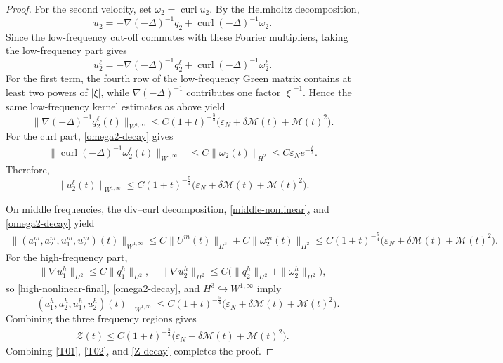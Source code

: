 \documentclass[10pt,a4paper]{amsart}
\begin{document}
\begin{proof}
For the second velocity, set $\omega_2=\operatorname{curl}u_2$. By the Helmholtz decomposition,
\[
u_2=-\nabla(-\Delta)^{-1}q_2
+\operatorname{curl}(-\Delta)^{-1}\omega_2.
\]
Since the low-frequency cut-off commutes with these Fourier multipliers,
taking the low-frequency part gives
\[
u_2^\ell=-\nabla(-\Delta)^{-1}q_2^\ell
+\operatorname{curl}(-\Delta)^{-1}\omega_2^\ell.
\]
For the first term, the fourth row of the low-frequency Green matrix
contains at least two powers of $|\xi|$, while
$\nabla(-\Delta)^{-1}$ contributes one factor $|\xi|^{-1}$.
Hence the same low-frequency kernel estimates as above yield
\[
\|\nabla(-\Delta)^{-1}q_2^\ell(t)\|_{W^{1,\infty}}
\le C(1+t)^{-\frac54}
\big(\varepsilon_N+\delta\mathcal M(t)+\mathcal M(t)^2\big).
\]
For the curl part, \eqref{omega2-decay} gives
\begin{align*}
\|\operatorname{curl}(-\Delta)^{-1}\omega_2^\ell(t)\|_{W^{1,\infty}}
&\le C\|\omega_2(t)\|_{H^2}
\le C\varepsilon_Ne^{-\frac{t}{2}}.
\end{align*}
Therefore,
\[%
\|u_2^\ell(t)\|_{W^{1,\infty}}
\le C(1+t)^{-\frac54}
\big(\varepsilon_N+\delta\mathcal M(t)+\mathcal M(t)^2\big).
\]%

On middle frequencies, the div--curl decomposition, \eqref{middle-nonlinear}, and
\eqref{omega2-decay} yield
\begin{align*}
 \|(a_1^m,a_2^m,u_1^m,u_2^m)(t)\|_{W^{1,\infty}}  \le C\|U^m(t)\|_{H^3}+C\|\omega_2^m(t)\|_{H^2} \le C(1+t)^{-\frac54}
\big(\varepsilon_N+\delta\mathcal M(t)+\mathcal M(t)^2\big).
\end{align*}
For the high-frequency part,
\begin{align*}
\|\nabla u_1^h\|_{H^2}\le C\|q_1^h\|_{H^2},\quad
\|\nabla u_2^h\|_{H^2}\le C\big(\|q_2^h\|_{H^2}+\|\omega_2^h\|_{H^2}\big),
\end{align*}
so \eqref{high-nonlinear-final}, \eqref{omega2-decay}, and
$H^3\hookrightarrow W^{1,\infty}$ imply
\[%
\|(a_1^h,a_2^h,u_1^h,u_2^h)(t)\|_{W^{1,\infty}}
\le C(1+t)^{-\frac54}
\big(\varepsilon_N+\delta\mathcal M(t)+\mathcal M(t)^2\big).
\]%
Combining the three frequency regions gives
\begin{align}\label{Z-decay}
\mathcal Z(t)
\le C(1+t)^{-\frac54}
\big(\varepsilon_N+\delta\mathcal M(t)+\mathcal M(t)^2\big).
\end{align}
Combining \eqref{T01}, \eqref{T02}, and \eqref{Z-decay} completes the proof.
\end{proof}
\end{document}
